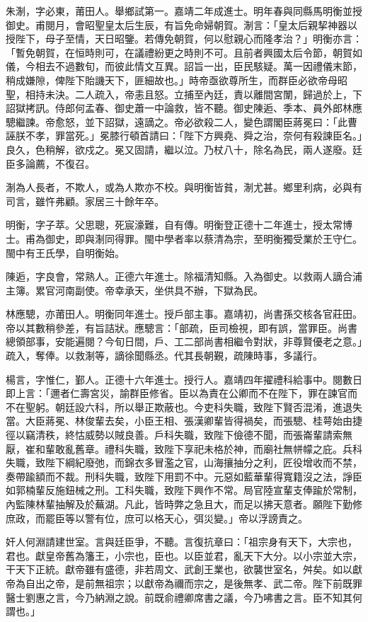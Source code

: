 \begin{pinyinscope}
{{朱淛，字必東，莆田人。舉鄉試第一。嘉靖二年成進士。明年春與同縣馬明衡並授御史。甫閱月，會昭聖皇太后生辰，有旨免命婦朝賀。淛言：「皇太后親挈神器以授陛下，母子至情，天日昭鑒。若傳免朝賀，何以慰親心而隆孝治？」明衡亦言：「暫免朝賀，在恒時則可，在議禮紛更之時則不可。且前者興國太后令節，朝賀如儀，今相去不過數旬，而彼此情文互異。詔旨一出，臣民駭疑。萬一因禮儀末節，稍成嫌隙，俾陛下貽譏天下，匪細故也。」時帝亟欲尊所生，而群臣必欲帝母昭聖，相持未決。二人疏入，帝恚且怒。立捕至內廷，責以離間宮闈，歸過於上，下詔獄拷訊。侍郎何孟春、御史蕭一中論救，皆不聽。御史陳逅、季本、員外郎林應驄繼諫。帝愈怒，並下詔獄，遠謫之。帝必欲殺二人，變色謂閣臣蔣冕曰：「此曹誣朕不孝，罪當死。」冕膝行頓首請曰：「陛下方興堯、舜之治，奈何有殺諫臣名。」良久，色稍解，欲戍之。冕又固請，繼以泣。乃杖八十，除名為民，兩人遂廢。廷臣多論薦，不復召。

淛為人長者，不欺人，或為人欺亦不校。與明衡皆貧，淛尤甚。鄉里利病，必與有司言，雖忤弗顧。家居三十餘年卒。

明衡，字子萃。父思聰，死宸濠難，自有傳。明衡登正德十二年進士，授太常博士。甫為御史，即與淛同得罪。閩中學者率以蔡清為宗，至明衡獨受業於王守仁。閩中有王氏學，自明衡始。

陳逅，字良會，常熟人。正德六年進士。除福清知縣。入為御史。以救兩人謫合浦主簿。累官河南副使。帝幸承天，坐供具不辦，下獄為民。

林應驄，亦莆田人。明衡同年進士。授戶部主事。嘉靖初，尚書孫交核各官莊田。帝以其數稍參差，有旨詰狀。應驄言：「部疏，臣司檢視，即有誤，當罪臣。尚書總領部事，安能遍閱？今旬日間，戶、工二部尚書相繼令對狀，非尊賢優老之意。」疏入，奪俸。以救淛等，謫徐聞縣丞。代其長朝覲，疏陳時事，多議行。

楊言，字惟仁，鄞人。正德十六年進士。授行人。嘉靖四年擢禮科給事中。閱數日即上言：「邇者仁壽宮災，諭群臣修省。臣以為責在公卿而不在陛下，罪在諫官而不在聖躬。朝廷設六科，所以舉正欺蔽也。今吏科失職，致陛下賢否混淆，進退失當。大臣蔣冕、林俊輩去矣，小臣王相、張漢卿輩皆得禍矣，而張驄、桂萼始由捷徑以竊清秩，終怙威勢以賊良善。戶科失職，致陛下儉德不聞，而張崙輩請索無厭，崔和輩敢亂舊章。禮科失職，致陛下享祀未格於神，而廟社無帡幪之庇。兵科失職，致陛下綱紀廢弛，而錦衣多冒濫之官，山海攘抽分之利，匠役增收而不禁，奏帶踰額而不裁。刑科失職，致陛下用罰不中。元惡如藍華輩得寬籍沒之法，諍臣如郭楠輩反施鈕械之刑。工科失職，致陛下興作不常。局官陸宣輩支俸踰於常制，內監陳林輩抽解及於蕪湖。凡此，皆時弊之急且大，而足以拂天意者。願陛下勤修庶政，而罷臣等以警有位，庶可以格天心，弭災變。」帝以浮謗責之。

奸人何淵請建世室。言與廷臣爭，不聽。言復抗章曰：「祖宗身有天下，大宗也，君也。獻皇帝舊為籓王，小宗也，臣也。以臣並君，亂天下大分。以小宗並大宗，干天下正統。獻帝雖有盛德，非若周文、武創王業也，欲襲世室名，舛矣。如以獻帝為自出之帝，是前無祖宗；以獻帝為禰而宗之，是後無孝、武二帝。陛下前既罪醫士劉惠之言，今乃納淵之說。前既俞禮卿席書之議，今乃咈書之言。臣不知其何謂也。」

}}
\end{pinyinscope}
